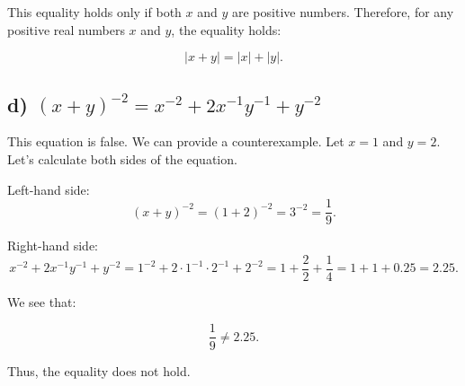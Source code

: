 \documentclass{article}
\begin{document}
This equality holds only if both $x$ and $y$ are positive numbers. Therefore, for any positive real numbers $x$ and $y$, the equality holds:

\[
|x + y| = |x| + |y|.
\]

\subsection*{d) $(x + y)^{-2} = x^{-2} + 2x^{-1}y^{-1} + y^{-2}$}

This equation is false. We can provide a counterexample. Let $x = 1$ and $y = 2$. Let’s calculate both sides of the equation.

Left-hand side:
\[
(x + y)^{-2} = (1 + 2)^{-2} = 3^{-2} = \frac{1}{9}.
\]

Right-hand side:
\[
x^{-2} + 2x^{-1}y^{-1} + y^{-2} = 1^{-2} + 2 \cdot 1^{-1} \cdot 2^{-1} + 2^{-2} = 1 + \frac{2}{2} + \frac{1}{4} = 1 + 1 + 0.25 = 2.25.
\]

We see that:

\[
\frac{1}{9} \neq 2.25.
\]

Thus, the equality does not hold.
\end{document}
